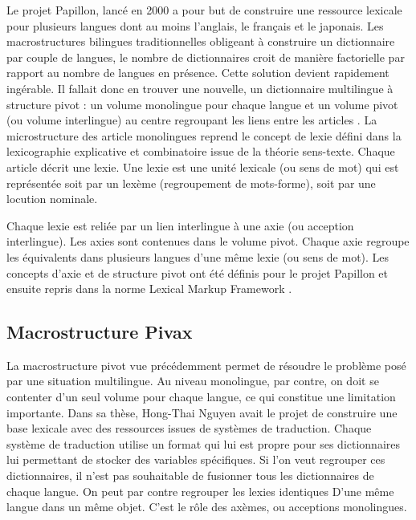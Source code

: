 \documentclass[10pt,a4paper,twoside]{article}
\begin{document}
Le projet Papillon, lancé en 2000 \cite{MTMMEP00} a pour but de construire une ressource lexicale pour plusieurs langues dont au moins l'anglais, le français et le japonais. Les macrostructures bilingues traditionnelles obligeant à construire un dictionnaire par couple de langues, le nombre de dictionnaires croit de manière factorielle par rapport au nombre de langues en présence. Cette solution devient rapidement ingérable. Il fallait donc en trouver une nouvelle, un dictionnaire multilingue à structure pivot : un volume monolingue pour chaque langue et un volume pivot (ou volume interlingue) au centre regroupant les liens entre les articles \cite{GSMM01a}. La microstructure des article monolingues reprend le concept de lexie défini dans la lexicographie explicative et combinatoire \cite{MelcukClasPolguere95} issue de la théorie sens-texte. Chaque article décrit une lexie. Une lexie est une unité lexicale (ou sens de mot) qui est représentée soit par un lexème (regroupement de mots-forme), soit par une locution nominale.

Chaque lexie est reliée par un lien interlingue à une axie (ou acception interlingue). Les axies sont contenues dans le volume pivot. Chaque axie regroupe les équivalents dans plusieurs langues d'une même lexie (ou sens de mot).
Les concepts d'axie et de structure pivot ont été définis pour le projet Papillon et ensuite repris dans la norme Lexical Markup Framework \cite{Francopoulo09}.


\subsection{Macrostructure Pivax}

La macrostructure pivot vue précédemment permet de résoudre le problème posé par une situation multilingue. Au niveau monolingue, par contre, on doit se contenter d'un seul volume pour chaque langue, ce qui constitue une limitation importante. Dans sa thèse, Hong-Thai Nguyen \cite{thèseHTN} avait le projet de construire une base lexicale avec des ressources issues de systèmes de traduction. Chaque système de traduction utilise un format qui lui est propre pour ses dictionnaires lui permettant de stocker des variables spécifiques. Si l'on veut regrouper ces dictionnaires, il n'est pas souhaitable de fusionner tous les dictionnaires de chaque langue. On peut par contre regrouper les lexies identiques D'une même langue dans un même objet. C'est le rôle des axèmes, ou acceptions monolingues.
\end{document}
